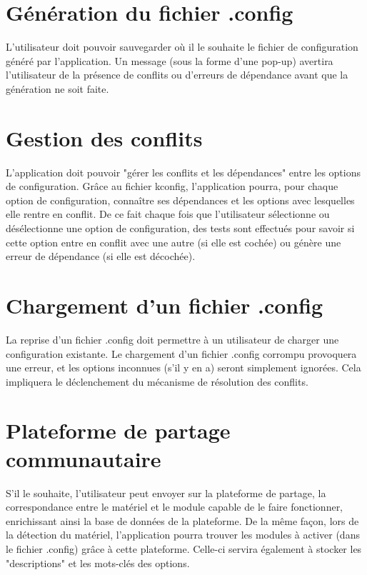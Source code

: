 \documentclass[16pts]{report}
\begin{document}
\section{Génération du fichier .config}
\label{sec:Génération du fichier .config}

L'utilisateur doit pouvoir sauvegarder où il le souhaite le fichier de
configuration généré par l'application. Un message (sous la forme d'une pop-up)
avertira l'utilisateur de la présence de conflits ou d'erreurs de dépendance
avant que la génération ne soit faite.

\section{Gestion des conflits}
\label{sec:Gestion des conflits}

L'application doit pouvoir "gérer les conflits et les dépendances" entre les
options de configuration. Grâce au fichier kconfig, l'application pourra, pour
chaque option de configuration, connaître ses dépendances et les options avec
lesquelles elle rentre en conflit. De ce fait chaque fois que l'utilisateur
sélectionne ou désélectionne une option de configuration, des tests sont
effectués pour savoir si cette option entre en conflit avec une autre (si elle
est cochée) ou génère une erreur de dépendance (si elle est décochée).

\section{Chargement d'un fichier .config}
\label{sec:Chargement d'un fichier .config}

La reprise d'un fichier .config doit permettre à un utilisateur de charger une
configuration existante. Le chargement d'un fichier .config corrompu provoquera
une erreur, et les options inconnues (s'il y en a) seront simplement ignorées.
Cela impliquera le déclenchement du mécanisme de résolution des conflits.

\section{Plateforme de partage communautaire}
\label{sec:Plateforme de partage communautaire}

S'il le souhaite, l'utilisateur peut envoyer sur la plateforme de partage, la
correspondance entre le matériel et le module capable de le faire fonctionner,
enrichissant ainsi la base de données de la plateforme.
De la même façon, lors de la détection du matériel, l'application pourra
trouver les modules à activer (dans le fichier .config) grâce à cette
plateforme. Celle-ci servira également à stocker les "descriptions" et les
mots-clés des options.
\end{document}
